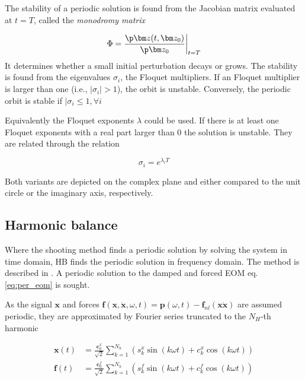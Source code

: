 The stability of a periodic solution is found from the Jacobian matrix evaluated
at $t=T$, called the \textit{monodromy matrix}

\begin{equation}
  \label{eq:sm_stab}
  \Phi = \frac{\p \bm z(t, \bm z_0)}{\p \bm z_0}\bigg|_{t=T}
\end{equation}
It determines whether a small initial perturbation decays or grows. The
stability is found from the eigenvalues $\sigma_i$, the Floquet multipliers. If an
Floquet multiplier is larger than one (i.e., $|\sigma_i|> 1$), the orbit is
unstable. Conversely, the periodic orbit is stable if $|\sigma_i \leq 1, \forall i$

Equivalently the Floquet exponents $\lambda$ could be used. If there is at least
one Floquet exponents with a real part larger than 0 the solution is unstable.
They are related through the relation

\begin{equation}
  \label{eq:floquet_relations}
  \sigma_i = e^{\lambda_i T}
\end{equation}

Both variants are depicted on the complex plane and either compared to the unit
circle or the imaginary axis, respectively.

\subsection{Harmonic balance}
\label{sec:harmonic_bal}

Where the shooting method finds a periodic solution by solving the system in
time domain, HB finds the periodic solution in frequency domain. The method is
described in \citet{detroux2016a}. A periodic solution to the damped and forced
EOM eq. \eqref{eq:per_eom} is sought.

As the signal $\bm x$ and forces $\bm f(\bm x, \dot{\bm x}, \omega ,t) = \bm
p(\omega, t)- \bm f_{nl}(\bm x \dot{\bm x})$ are assumed periodic, they are
approximated by Fourier series truncated to the $N_H$-th harmonic

\begin{align}
  \label{eq:hb_x_expansion}
  \bm x(t) &= \frac{\bm c^x_0}{\sqrt{2}} \sum_{k=1}^{N_h} (s^x_k \sin(k\omega t) +
          c^x_k \cos(k\omega t)) \\
  \label{eq:hb_f_expansion}
  \bm f(t) &= \frac{\bm c^f_0}{\sqrt{2}} \sum_{k=1}^{N_h} (s^f_k \sin(k\omega t) +
          c^f_k \cos(k\omega t))
\end{align}

